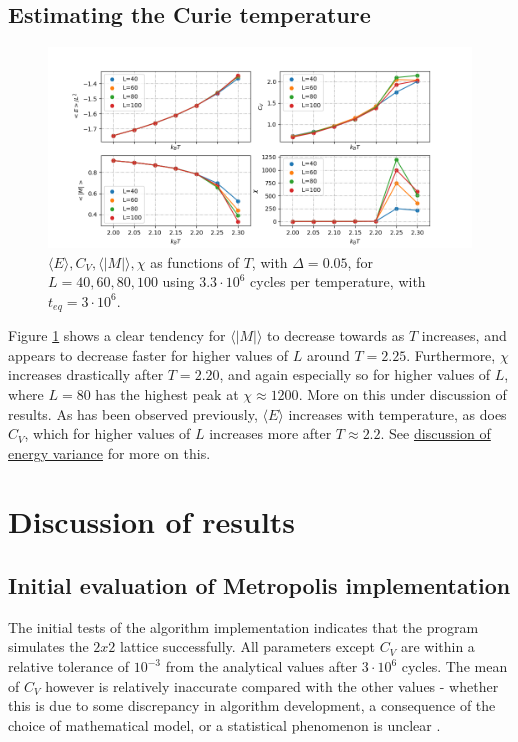 \documentclass[%
oneside,                 %
final,                   %
10pt]{article}
\begin{document}
\subsection{Estimating the Curie temperature}
\label{SS.estCurie}
\begin{figure}[!htb]
        \centering 
         \includegraphics[scale=.6]{../Results/initial_phase.png} 
        \caption{$\langle E \rangle, C_V, \langle | M | \rangle, \chi$ as functions of $T$, with $\Delta=0.05$, for $L=40,60,80,100$ using $3.3\cdot 10^6$ cycles per temperature, with $t_{eq}=3 \cdot 10^6$.}
        \label{fig:initial_phase}   
\end{figure}

Figure \ref{fig:initial_phase} shows a clear tendency for $\langle |M| \rangle$ to decrease towards as $T$ increases, and appears to decrease faster for higher values of $L$ around $T=2.25$. Furthermore, $\chi$ increases drastically after $T=2.20$, and again especially so for higher values of $L$, where $L=80$ has the highest peak at $\chi \approx 1200$. More on this under discussion of results. As has been observed previously, $\langle E \rangle$ increases with temperature, as does $C_V$, which for higher values of $L$ increases more after $T\approx 2.2$. See \hyperref[SS.disc.var]{discussion of energy variance} for more on this.

\section{Discussion of results}
\subsection{Initial evaluation of Metropolis implementation}
\label{SS:Disucssion_init_eval}
The initial tests of the algorithm implementation indicates that the program simulates the $2x2$ lattice successfully. All parameters except $C_V$ are within a relative tolerance of $10^{-3}$ from the analytical values after $3 \cdot 10^6$ cycles. The mean of $C_V$ however is relatively inaccurate compared with the other values - whether this is due to some discrepancy in algorithm development, a consequence of the choice of mathematical model, or a statistical phenomenon is unclear . \newline
\end{document}
